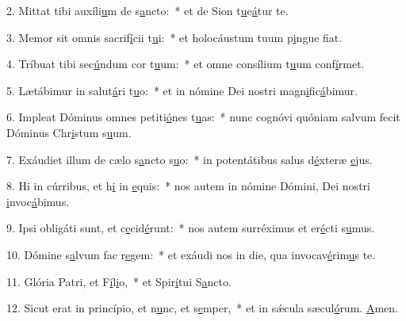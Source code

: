 2. Mittat tibi auxíli\uline{u}m de s\uline{a}ncto:~* et de Sion t\uline{u}e\uline{á}tur te.\par 
3. Memor sit omnis sacrif\uline{í}cii t\uline{u}i:~* et holocáustum tuum p\uline{i}ngue f\uline{i}at.\par 
4. Tríbuat tibi sec\uline{ú}ndum cor t\uline{u}um:~* et omne consílium t\uline{u}um conf\uline{í}rmet.\par 
5. Lætábimur in salut\uline{á}ri t\uline{u}o:~* et in nómine Dei nostri magn\uline{i}fic\uline{á}bimur.\par 
6. Impleat Dóminus omnes petiti\uline{ó}nes t\uline{u}as:~* nunc cognóvi quóniam salvum fecit Dóminus Chr\uline{i}stum s\uline{u}um.\par 
7. Exáudiet illum de cælo s\uline{a}ncto s\uline{u}o:~* in potentátibus salus d\uline{é}xteræ \uline{e}jus.\par 
8. Hi in cúrribus, et h\uline{i} in \uline{e}quis:~* nos autem in nómine Dómini, Dei nostri \uline{i}nvoc\uline{á}bimus.\par 
9. Ipsi obligáti sunt, et c\uline{e}cid\uline{é}runt:~* nos autem surréximus et er\uline{é}cti s\uline{u}mus.\par 
10. Dómine s\uline{a}lvum fac r\uline{e}gem:~* et exáudi nos in die, qua invocav\uline{é}rim\uline{u}s te.\par 
11. Glória Patri, et F\uline{í}l\uline{i}o,~* et Spir\uline{í}tui S\uline{a}ncto.\par 
12. Sicut erat in princípio, et n\uline{u}nc, et s\uline{e}mper,~* et in sǽcula sæcul\uline{ó}rum. \uline{A}men.\par 
